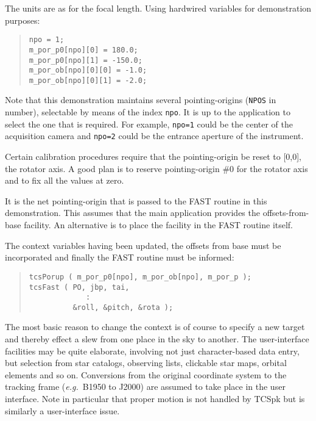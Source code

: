 \documentclass[12pt,fleqn,twoside]{article}
\renewcommand{\_}{{\tt\char'137}}     %
\begin{document}
The units are as for the focal length.  Using hardwired
variables for demonstration purposes:
\begin{quote}
\begin{small}
\begin{verbatim}
npo = 1;
m_por_p0[npo][0] = 180.0;
m_por_p0[npo][1] = -150.0;
m_por_ob[npo][0][0] = -1.0;
m_por_ob[npo][0][1] = -2.0;
\end{verbatim}\end{small}
\end{quote}
Note that this demonstration maintains
several pointing-origins ({\tt NPOS} in number), selectable by
means of the index {\tt npo}.  It is up to the application to select the
one that is required.  For example, {\tt npo=1} could be the center of the
acquisition camera and {\tt npo=2} could be the entrance aperture of the
instrument.

Certain calibration procedures require that the pointing-origin be
reset to [0,0], the rotator axis.  A good plan is to reserve
pointing-origin \#0 for the rotator axis and to fix all the values
at zero.

It is the net pointing-origin that is passed to the FAST routine
in this demonstration.  This assumes that the main application
provides the offsets-from-base facility.  An alternative is to
place the facility in the FAST routine itself.

The context variables having been updated, the offsets from
base must be incorporated and finally the FAST routine must be
informed:
\begin{quote}
\begin{small}
\begin{verbatim}
tcsPorup ( m_por_p0[npo], m_por_ob[npo], m_por_p );
tcsFast ( PO, jbp, tai,
             :
          &roll, &pitch, &rota );
\end{verbatim}\end{small}
\end{quote}
The most basic reason to change the context is of course to specify
a new target and thereby effect a slew from one place in the sky
to another.  The user-interface facilities may be quite elaborate,
involving not just character-based data entry, but selection from
star catalogs, observing lists, clickable star maps,
orbital elements and so on.  Conversions from the original
coordinate system to the tracking frame ({\it e.g.}~B1950 to J2000)
are assumed to take place in the user interface.  Note in particular
that proper motion is not handled by TCSpk but is similarly a
user-interface issue.
\end{document}
